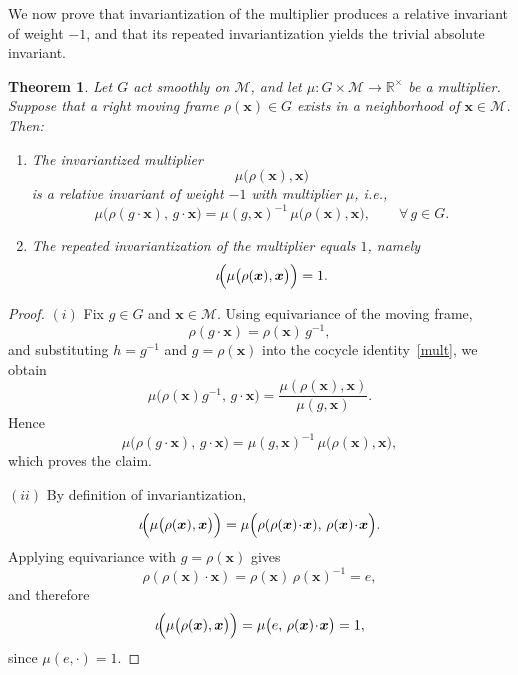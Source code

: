 \documentclass[12pt,reqno]{amsart}
\newtheorem{theorem}{Theorem}
\begin{document}
\medskip


We now prove that invariantization of the multiplier produces a relative invariant of weight $-1$, and that its repeated invariantization yields the trivial absolute invariant.

\begin{theorem}\label{inv-jak}
Let $G$ act smoothly on $\mathcal M$, and let
$\mu : G \times \mathcal M \to \mathbb{R}^\times$ be a multiplier.
Suppose that a right moving frame $\rho( \boldsymbol x) \in G$ exists in a neighborhood of $\boldsymbol x \in \mathcal M$.
Then:

\begin{enumerate}
\item[$(i)$] The {invariantized multiplier}
\[
\mu\bigl(\rho(\boldsymbol x),\boldsymbol x\bigr)
\]
is a relative invariant of weight $-1$ with multiplier $\mu$, i.e.,
\[
\mu\bigl(\rho(g \cdot \boldsymbol x),\,g \cdot \boldsymbol x\bigr)
=
\mu(g,\boldsymbol x)^{-1}\,\mu\bigl(\rho(\boldsymbol x),\boldsymbol x\bigr),
\qquad \forall\, g\in G.
\]

\item[$(ii)$] The repeated invariantization of the multiplier equals $1$, namely
\[
\iota\!\Bigl(\mu\bigl(\rho(\boldsymbol x),\boldsymbol x\bigr)\Bigr)=1.
\]
\end{enumerate}
\end{theorem}

\begin{proof}
$(i)$ Fix $g \in G$ and $\boldsymbol x \in \mathcal M$. Using equivariance of the moving frame,
\[
\rho(g \cdot \boldsymbol x) = \rho(\boldsymbol x)\,g^{-1},
\]
and substituting $h = g^{-1}$ and $g = \rho(\boldsymbol x)$ into the cocycle identity~\eqref{mult},
we obtain
\[
\mu\bigl(\rho(\boldsymbol x)g^{-1},\,g \cdot \boldsymbol x\bigr)
=
\frac{\mu(\rho(\boldsymbol x),\boldsymbol x)}{\mu(g,\boldsymbol x)}.
\]
Hence
\[
\mu\bigl(\rho(g \cdot \boldsymbol x),\,g \cdot \boldsymbol x\bigr)
=
\mu(g,\boldsymbol x)^{-1}\,\mu\bigl(\rho(\boldsymbol x),\boldsymbol x\bigr),
\]
which proves the claim.

$(ii)$  By definition of invariantization,
\[
\iota\!\Bigl(\mu\bigl(\rho(\boldsymbol x),\boldsymbol x\bigr)\Bigr)
=
\mu\Bigl(\rho(\rho(\boldsymbol x)\!\cdot\!\boldsymbol x),\,\rho(\boldsymbol x)\!\cdot\!\boldsymbol x\Bigr).
\]
Applying equivariance with $g=\rho(\boldsymbol x)$ gives
\[
\rho(\rho(\boldsymbol x)\!\cdot\!\boldsymbol x)=\rho(\boldsymbol x)\,\rho(\boldsymbol x)^{-1}=e,
\]
and therefore
\[
\iota\!\Bigl(\mu\bigl(\rho(\boldsymbol x),\boldsymbol x\bigr)\Bigr)
=
\mu\bigl(e,\,\rho(\boldsymbol x)\!\cdot\!\boldsymbol x\bigr)=1,
\]
since $\mu(e,\cdot)=1$.
\end{proof}
\end{document}
